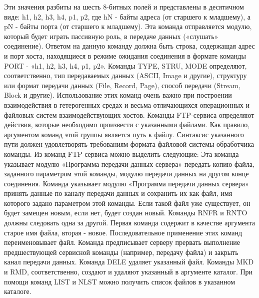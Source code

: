 Эти значения разбиты на шесть 8-битных полей и представлены в десятичном виде: h1, h2, h3, h4, p1, p2, где hN - байты адреса (от старшего к младшему), а pN - байты порта (от старшего к младшему). 
Эта команда отправляется модулю, который будет играть пассивную роль, в передаче данных («слушать» соединение). Ответом на данную команду должна быть строка, содержащая адрес и порт хоста, находящиеся в режиме ожидания соединения в формате команды PORT - «h1, h2, h3, h4, p1, p2». 
Команды TYPE, STRU, MODE определяют, соответственно, тип передаваемых данных (ASCII, Image и другие), структуру или формат передачи данных (File, Record, Page), способ передачи (Stream, Block и другие). 
Использование этих команд очень важно при построении взаимодействия в гетерогенных средах и весьма отличающихся операционных и файловых систем взаимодействующих хостов. 
Команды FTP-сервиса определяют действия, которые необходимо произвести с указанными файлами. 
Как правило, аргументом команд этой группы является путь к файлу. Синтаксис указанного пути должен удовлетворять требованиям формата файловой системы обработчика команды. 
Из команд FTP-сервиса можно выделить следующие: 
Эта команда указывает модулю «Программа передачи данных сервера» передать копию файла, заданного параметром этой команды, модулю передачи данных на другом конце соединения. 
Команда указывает модулю «Программа передачи данных сервера» принять данные по каналу передачи данных и сохранить их как файл, имя которого задано параметром этой команды. 
Если такой файл уже существует, он будет замещен новым, если нет, будет создан новый. Команды RNFR и RNTO должны следовать одна за другой. 
Первая команда содержит в качестве аргумента старое имя файла, вторая - новое. Последовательное применение этих команд переименовывает файл.
Команда предписывает серверу прервать выполнение предшествующей сервисной команды (например, передачу файла) и закрыть канал передачи данных. 
Команда DELE удаляет указанный файл. Команды MKD и RMD, соответственно, создают и удаляют указанный в аргументе каталог. 
При помощи команд LIST и NLST можно получить список файлов в указанном каталоге.

